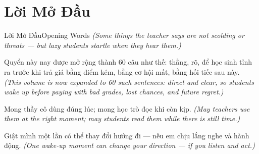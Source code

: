 \chapter*{Lời Mở Đầu}

\begin{truyen}{Lời Mở Đầu}{Opening Words}
\textit{(Some things the teacher says are not scolding or threats — but lazy students startle when they hear them.)}

Quyển này nay được mở rộng thành 60 câu như thế: thẳng, rõ, để học sinh tỉnh ra trước khi trả giá bằng điểm kém, bằng cơ hội mất, bằng hối tiếc sau này.
\textit{(This volume is now expanded to 60 such sentences: direct and clear, so students wake up before paying with bad grades, lost chances, and future regret.)}

Mong thầy cô dùng đúng lúc; mong học trò đọc khi còn kịp.
\textit{(May teachers use them at the right moment; may students read them while there is still time.)}
\end{truyen}

\begin{baihoc}
Giật mình một lần có thể thay đổi hướng đi — nếu em chịu lắng nghe và hành động.
\textit{(One wake-up moment can change your direction — if you listen and act.)}
\end{baihoc}
\ngancach
